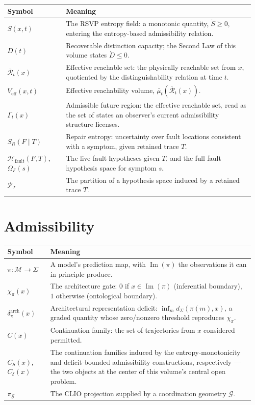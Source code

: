 \documentclass[12pt]{report}
\newcommand{\SR}{\ensuremath{S_R}}
\begin{document}
\begin{center}
\begin{tabular}{lp{4.6in}}
\hline
Symbol & Meaning \\
\hline
$S(x,t)$ & The RSVP entropy field: a monotonic quantity, $\dot{S} \geq
0$, entering the entropy-based admissibility relation. \\
$D(t)$ & Recoverable distinction capacity; the Second Law of this
volume states $\dot{D} \leq 0$. \\
$\overline{\mathcal{R}}_t(x)$ & Effective reachable set: the physically
reachable set from $x$, quotiented by the distinguishability relation at
time $t$. \\
$V_{\mathrm{eff}}(x,t)$ & Effective reachability volume, $\bar\mu_t(\overline{\mathcal{R}}_t(x))$. \\
$\Gamma_t(x)$ & Admissible future region: the effective reachable set,
read as the set of states an observer's current admissibility structure
licenses. \\
$\SR(F \mid T)$ & Repair entropy: uncertainty over fault locations
consistent with a symptom, given retained trace $T$. \\
$\mathcal{H}_{\mathrm{fault}}(F,T)$, $\Omega_F(s)$ & The live fault
hypotheses given $T$, and the full fault hypothesis space for symptom
$s$. \\
$\mathcal{P}_T$ & The partition of a hypothesis space induced by a
retained trace $T$. \\
\hline
\end{tabular}
\end{center}

\section*{Admissibility}

\begin{center}
\begin{tabular}{lp{4.6in}}
\hline
Symbol & Meaning \\
\hline
$\pi : \mathcal{M} \to \Sigma$ & A model's prediction map, with
$\operatorname{Im}(\pi)$ the observations it can in principle produce. \\
$\chi_\pi(x)$ & The architecture gate: $0$ if $x \in \operatorname{Im}(\pi)$
(inferential boundary), $1$ otherwise (ontological boundary). \\
$\delta_\pi^{\mathrm{arch}}(x)$ & Architectural representation deficit:
$\inf_{m} d_\Sigma(\pi(m), x)$, a graded quantity whose zero/nonzero
threshold reproduces $\chi_\pi$. \\
$C(x)$ & Continuation family: the set of trajectories from $x$
considered permitted. \\
$C_S(x)$, $C_\delta(x)$ & The continuation families induced by the
entropy-monotonicity and deficit-bounded admissibility constructions,
respectively --- the two objects at the center of this volume's central
open problem. \\
$\pi_{\mathcal{G}}$ & The CLIO projection supplied by a coordination
geometry $\mathcal{G}$. \\
\hline
\end{tabular}
\end{center}
\end{document}
